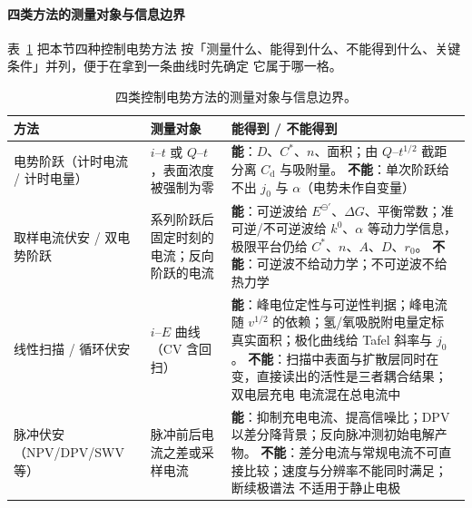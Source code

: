 \paragraph{四类方法的测量对象与信息边界} 表~\ref{tab:methods} 把本节四种控制电势方法
按「测量什么、能得到什么、不能得到什么、关键条件」并列，便于在拿到一条曲线时先确定
它属于哪一格。

\begin{table}[htbp]
\centering
\caption{四类控制电势方法的测量对象与信息边界。}
\label{tab:methods}
{\srcsize
\begin{tabularx}{\columnwidth}{@{}lXX@{}}
\toprule
方法 & 测量对象 & 能得到 / 不能得到 \\
\midrule
电势阶跃（计时电流 / 计时电量） &
$i$--$t$ 或 $Q$--$t$，表面浓度被强制为零 &
\textbf{能}：$D$、$C^*$、$n$、面积；由 $Q$--$t^{1/2}$ 截距分离 $C_{\mathrm{d}}$ 与吸附量。
\textbf{不能}：单次阶跃给不出 $j_0$ 与 $\alpha$（电势未作自变量） \\
\addlinespace
取样电流伏安 / 双电势阶跃 &
系列阶跃后固定时刻的电流；反向阶跃的电流 &
\textbf{能}：可逆波给 $E^{\ominus\prime}$、$\Delta G$、平衡常数；准可逆/不可逆波给
$k^0$、$\alpha$ 等动力学信息，极限平台仍给 $C^*$、$n$、$A$、$D$、$r_0$。
\textbf{不能}：可逆波不给动力学；不可逆波不给热力学 \\
\addlinespace
线性扫描 / 循环伏安 &
$i$--$E$ 曲线（CV 含回扫） &
\textbf{能}：峰电位定性与可逆性判据；峰电流随 $v^{1/2}$ 的依赖；氢/氧吸脱附电量定标
真实面积；极化曲线给 Tafel 斜率与 $j_0$。
\textbf{不能}：扫描中表面与扩散层同时在变，直接读出的活性是三者耦合结果；双电层充电
电流混在总电流中 \\
\addlinespace
脉冲伏安（NPV/DPV/SWV 等） &
脉冲前后电流之差或采样电流 &
\textbf{能}：抑制充电电流、提高信噪比；DPV 以差分降背景；反向脉冲测初始电解产物。
\textbf{不能}：差分电流与常规电流不可直接比较；速度与分辨率不能同时满足；断续极谱法
不适用于静止电极 \\
\bottomrule
\end{tabularx}}
\end{table}

